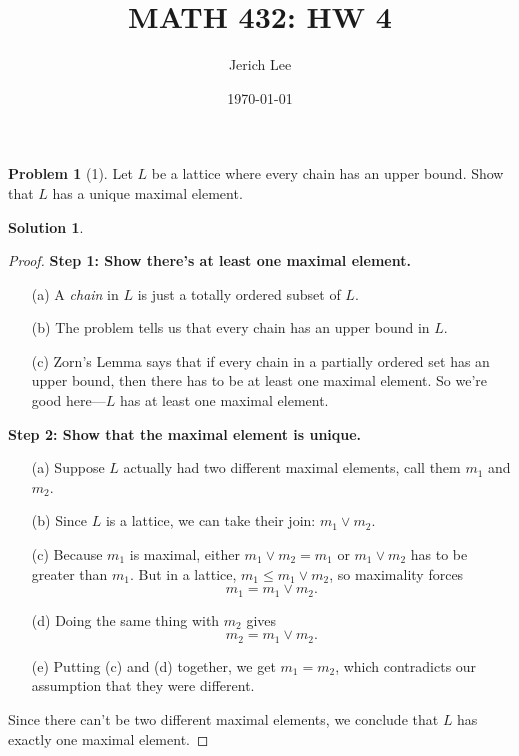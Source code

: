 \documentclass[12pt]{article}
\title{MATH 432: HW 4}
\author{Jerich Lee}
\date{\today}
\theoremstyle{definition} %
\newtheorem{solution}{Solution}
\newtheorem{problem}{Problem}
\theoremstyle{plain} %
\begin{document}
\maketitle
\begin{problem}[1]
    Let $L$ be a lattice where every chain has an upper bound. Show that $L$ has a unique maximal element.
\end{problem}
\begin{solution}
    \begin{proof}
    \textbf{Step 1: Show there's at least one maximal element.}
    
    \begin{enumerate}
        \item[(a)] A \emph{chain} in $L$ is just a totally ordered subset of $L$.
        \item[(b)] The problem tells us that every chain has an upper bound in $L$. 
        \item[(c)] Zorn's Lemma says that if every chain in a partially ordered set has an upper bound, then there has to be at least one maximal element. So we're good here—$L$ has at least one maximal element.
    \end{enumerate}
    
    \textbf{Step 2: Show that the maximal element is unique.}
    
    \begin{enumerate}
        \item[(a)] Suppose $L$ actually had two different maximal elements, call them $m_1$ and $m_2$.
        \item[(b)] Since $L$ is a lattice, we can take their join: $m_1 \vee m_2$.
        \item[(c)] Because $m_1$ is maximal, either $m_1 \vee m_2 = m_1$ or $m_1 \vee m_2$ has to be greater than $m_1$. But in a lattice, $m_1 \leq m_1 \vee m_2$, so maximality forces
        \[
            m_1 = m_1 \vee m_2.
        \]
        \item[(d)] Doing the same thing with $m_2$ gives
        \[
            m_2 = m_1 \vee m_2.
        \]
        \item[(e)] Putting (c) and (d) together, we get $m_1 = m_2$, which contradicts our assumption that they were different.
    \end{enumerate}
    
    Since there can't be two different maximal elements, we conclude that $L$ has exactly one maximal element.
    \end{proof}
\end{solution}
\end{document}
